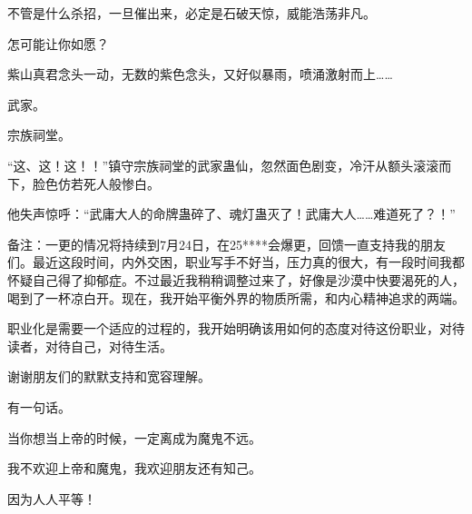 \begin{this_body}
不管是什么杀招，一旦催出来，必定是石破天惊，威能浩荡非凡。

怎可能让你如愿？

紫山真君念头一动，无数的紫色念头，又好似暴雨，喷涌激射而上……

武家。

宗族祠堂。

“这、这！这！！”镇守宗族祠堂的武家蛊仙，忽然面色剧变，冷汗从额头滚滚而下，脸色仿若死人般惨白。

他失声惊呼：“武庸大人的命牌蛊碎了、魂灯蛊灭了！武庸大人……难道死了？！”

备注：一更的情况将持续到7月24日，在25****会爆更，回馈一直支持我的朋友们。最近这段时间，内外交困，职业写手不好当，压力真的很大，有一段时间我都怀疑自己得了抑郁症。不过最近我稍稍调整过来了，好像是沙漠中快要渴死的人，喝到了一杯凉白开。现在，我开始平衡外界的物质所需，和内心精神追求的两端。

职业化是需要一个适应的过程的，我开始明确该用如何的态度对待这份职业，对待读者，对待自己，对待生活。

谢谢朋友们的默默支持和宽容理解。

有一句话。

当你想当上帝的时候，一定离成为魔鬼不远。

我不欢迎上帝和魔鬼，我欢迎朋友还有知己。

因为人人平等！

\end{this_body}

